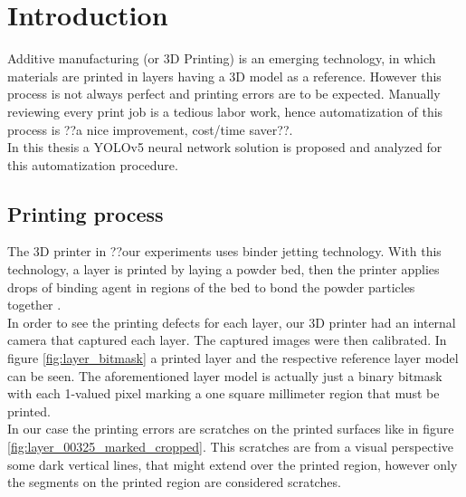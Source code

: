\section{Introduction}
Additive manufacturing (or 3D Printing) is an emerging technology, in which
materials are printed in layers having a 3D model as a reference. However this process is not always perfect and printing errors are to be expected. Manually reviewing every print job is a tedious labor work, hence automatization of this process is ??a nice improvement, cost/time saver??. \\
In this thesis a YOLOv5 \cite{yolov5_git} neural network solution is proposed and analyzed for this automatization procedure.
\par

\subsection{Printing process}
The 3D printer in ??our experiments uses binder jetting technology. With this technology, a layer is printed by laying a powder bed, then the printer applies drops of binding agent in regions of the bed to bond the powder particles together \cite{binder_jetting}. \\
In order to see the printing defects for each layer, our 3D printer had an internal camera that captured each layer. The captured images were then calibrated. In figure \ref{fig:layer_bitmask} a printed layer and the respective reference layer model can be seen. The aforementioned layer model is actually just a binary bitmask with each 1-valued pixel marking a one square millimeter region that must be printed.\\
In our case the printing errors are scratches on the printed surfaces like in figure \ref{fig:layer_00325_marked_cropped}. This scratches are from a visual perspective some dark vertical lines, that might extend over the printed region, however only the segments on the printed region are considered scratches.


